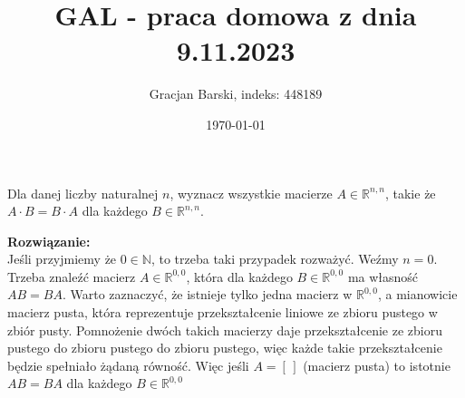\documentclass[12pt]{article}
\title{GAL - praca domowa z dnia 9.11.2023}
\author{Gracjan Barski, indeks: 448189}
\date{\today}
\newcommand{\R}{\mathbb{R}}
\newcommand{\N}{\mathbb{N}}
\begin{document}
\maketitle
\begin{center}
Dla danej liczby naturalnej $n$, wyznacz wszystkie macierze $A \in \R^{n, n}$, takie że $A \cdot B = B \cdot A$ dla każdego $B \in \R^{n, n}$.
\end{center}

\textbf{Rozwiązanie:} \\[10pt]
Jeśli przyjmiemy że $0 \in \N$, to trzeba taki przypadek rozważyć. Weźmy $n = 0$. Trzeba znaleźć macierz $A \in \R^{0,0}$, która dla każdego $B \in \R^{0,0}$ ma własność $AB = BA$. Warto zaznaczyć, że istnieje tylko jedna macierz w $\R^{0,0}$, a mianowicie macierz pusta, która reprezentuje przekształcenie liniowe ze zbioru pustego w zbiór pusty. Pomnożenie dwóch takich macierzy daje przekształcenie ze zbioru pustego do zbioru pustego do zbioru pustego, więc każde takie przekształcenie będzie spełniało żądaną równość. Więc jeśli $A = [\, ]$ (macierz pusta) to istotnie $AB = BA$ dla każdego $B \in \R^{0,0}$ \\[10pt]
\end{document}
